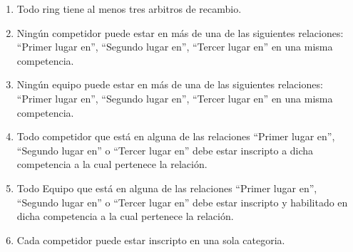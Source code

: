 \begin{enumerate}
    \item Todo ring tiene al menos tres arbitros de recambio.
    \item Ningún competidor puede estar en más de una de las siguientes relaciones: ``Primer lugar en'', ``Segundo lugar en'', ``Tercer lugar en'' en una misma competencia.
    \item Ningún equipo puede estar en más de una de las siguientes relaciones: ``Primer lugar en'', ``Segundo lugar en'', ``Tercer lugar en'' en una misma competencia.
    \item Todo competidor que está en alguna de las relaciones ``Primer lugar en'', ``Segundo lugar en'' o ``Tercer lugar en'' debe estar inscripto a dicha competencia a la cual pertenece la relación.
    \item Todo Equipo que está en alguna de las relaciones ``Primer lugar en'', ``Segundo lugar en'' o ``Tercer lugar en'' debe estar inscripto y habilitado en dicha competencia a la cual pertenece la relación.
    \item Cada competidor puede estar inscripto en una sola categoria.
\end{enumerate}

